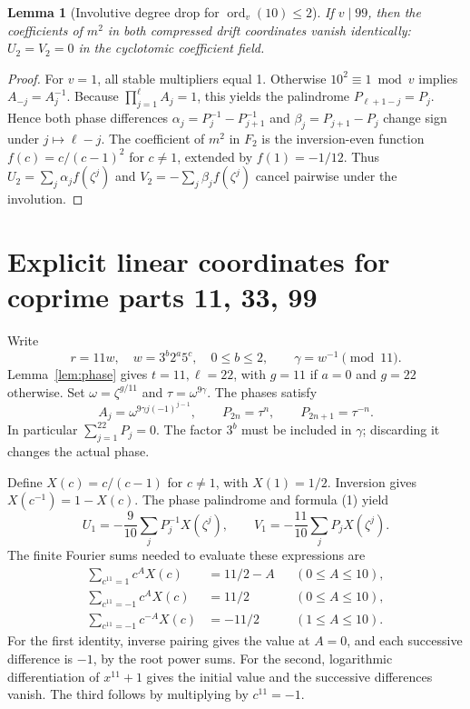 \documentclass[10pt]{article}
\newtheorem{lemma}{Lemma}
\DeclareMathOperator{\ord}{ord}
\begin{document}
\begin{lemma}[Involutive degree drop for \(\ord_v(10)\le2\)]
If \(v\mid99\), then the coefficients of \(m^2\) in
both compressed drift coordinates vanish identically:
\(U_2=V_2=0\) in the cyclotomic coefficient field.
\end{lemma}
\begin{proof}
For \(v=1\), all stable multipliers equal 1.
Otherwise \(10^2\equiv1\bmod v\) implies
\(A_{-j}=A_j^{-1}\). Because
\(\prod_{j=1}^{\ell}A_j=1\), this yields the
palindrome \(P_{\ell+1-j}=P_j\).
Hence both phase differences
\(\alpha_j=P_j^{-1}-P_{j+1}^{-1}\) and
\(\beta_j=P_{j+1}-P_j\) change sign
under \(j\mapsto\ell-j\).
The coefficient of \(m^2\) in \(F_2\) is the
inversion-even function \(f(c)=c/(c-1)^2\)
for \(c\ne1\), extended by \(f(1)=-1/12\).
Thus \(U_2=\sum_j\alpha_jf(\zeta^j)\) and
\(V_2=-\sum_j\beta_jf(\zeta^j)\)
cancel pairwise under the involution.
\end{proof}

\section{Explicit linear coordinates for coprime parts 11, 33, 99}
Write
\[
r=11w,\quad w=3^b2^a5^c,\quad 0\le b\le2,\qquad
\gamma=w^{-1}\pmod{11}.
\]
Lemma~\ref{lem:phase} gives \(t=11,\ell=22\), with
\(g=11\) if \(a=0\) and \(g=22\) otherwise.
Set \(\omega=\zeta^{g/11}\) and \(\tau=\omega^{9\gamma}\).
The phases satisfy
\[
A_j=\omega^{9\gamma j(-1)^{j-1}},\qquad
P_{2n}=\tau^n,\qquad P_{2n+1}=\tau^{-n}.
\]
In particular \(\sum_{j=1}^{22}P_j=0\). The factor \(3^b\)
must be included in \(\gamma\); discarding it changes the actual phase.

Define \(X(c)=c/(c-1)\) for \(c\ne1\), with \(X(1)=1/2\).
Inversion gives \(X(c^{-1})=1-X(c)\). The phase palindrome and
formula (1) yield
\[
U_1=-\frac9{10}\sum_jP_j^{-1}X(\zeta^j),\qquad
V_1=-\frac{11}{10}\sum_jP_jX(\zeta^j).
\]
The finite Fourier sums needed to evaluate these expressions are
\[
\begin{aligned}
\sum_{c^{11}=1}c^A X(c)&=11/2-A &&(0\le A\le10),\\
\sum_{c^{11}=-1}c^A X(c)&=11/2 &&(0\le A\le10),\\
\sum_{c^{11}=-1}c^{-A}X(c)&=-11/2 &&(1\le A\le10).
\end{aligned}
\]
For the first identity, inverse pairing gives the value at \(A=0\),
and each successive difference is \(-1\), by the root power sums.
For the second, logarithmic differentiation of \(x^{11}+1\) gives
the initial value and the successive differences vanish. The third
follows by multiplying by \(c^{11}=-1\).
\end{document}
